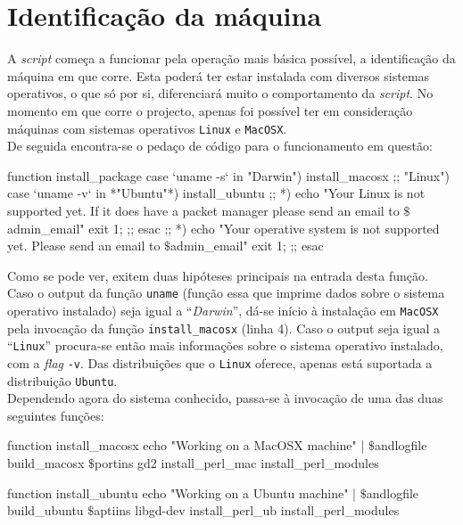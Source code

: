 \section{Identificação da máquina}\label{sec idmaq}

A \emph{script} começa a funcionar pela operação mais básica possível, a identificação da máquina em que corre. Esta poderá ter estar instalada com diversos sistemas operativos, o que 
só por si, diferenciará muito o comportamento da \emph{script}. No momento em que corre o projecto, apenas foi possível ter em consideração máquinas com sistemas operativos \texttt{Linux}
 e \texttt{MacOSX}.\\

De seguida encontra-se o pedaço de código para o funcionamento em questão:\\

\begin{myxml}
function install_package {
        case `uname -s` in
                "Darwin")
                        install_macosx
                        ;;
                "Linux")
	case `uname -v` in
		*"Ubuntu"*)
		install_ubuntu
		;;
		*)
		echo "Your Linux is not supported yet. If it does have a packet manager please send an email to $\$$admin_email"
		exit 1;
		;;
		esac
		;;
                *)
		echo "Your operative system is not supported yet. Please send an email to $\$$admin_email"
		exit 1;
		;;
        esac
}
\end{myxml}

Como se pode ver, exitem duas hipóteses principais na entrada desta função. Caso o output da função \texttt{uname} (função essa que imprime dados sobre o sistema operativo
 instalado) seja igual a ``\emph{Darwin}'', dá-se início à instalação em \texttt{MacOSX} pela invocação da função \texttt{install\_macosx} (linha 4). Caso o output seja igual a 
``\texttt{Linux}'' procura-se então mais informações sobre o sistema operativo instalado, com a \emph{flag} \texttt{-v}. Das distribuições que o \texttt{Linux} oferece, apenas está 
suportada a distribuição \texttt{Ubuntu}.\\

Dependendo agora do sistema conhecido, passa-se à invocação de uma das duas seguintes funções:\\

\begin{myxml}
function install_macosx {
        echo "Working on a MacOSX machine" | $\$$andlogfile
        build_macosx
        $\$$portins gd2
        install_perl_mac
        install_perl_modules
}

function install_ubuntu {
        echo "Working on a Ubuntu machine" | $\$$andlogfile
        build_ubuntu
        $\$$aptiins libgd-dev
        install_perl_ub
        install_perl_modules
}

\end{myxml}

